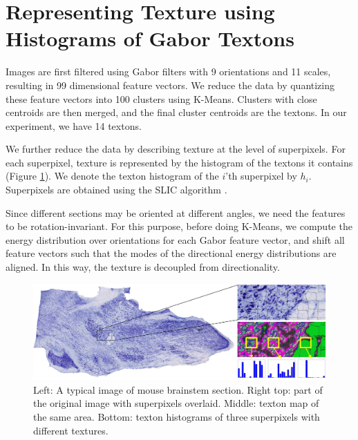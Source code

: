 \documentclass{llncs}
\begin{document}
\section{Representing Texture using Histograms of Gabor Textons} 

%
%
%

Images are first filtered using Gabor filters\cite{jain1990unsupervised} with 9 orientations and 11 scales, resulting in 99 dimensional feature vectors. We reduce the data by quantizing these feature vectors into 100 clusters using K-Means. Clusters with close centroids are then merged, and the final cluster centroids are the textons. In our experiment, we have 14 textons.


We further reduce the data by describing texture at the level of superpixels. For each superpixel, texture is represented by the histogram of the textons it contains (Figure \ref{fig:TextonHistComparison}). We denote the texton histogram of the $i$'th superpixel by $h_i$. Superpixels are obtained using the SLIC algorithm \cite{achanta2012slic}.

Since different sections may be oriented at different angles, 
we need the features to be rotation-invariant. For this purpose, before doing K-Means, we compute the energy distribution over orientations for each Gabor feature vector, and shift all feature vectors such that the modes of the directional energy distributions are aligned. In this way, the texture is decoupled from directionality.


\begin{figure}
\centering
	\includegraphics[width=.8\textwidth]{../figures/OrigImgTexMapWithInset.png}
	\caption{Left: A typical image of mouse brainstem section. Right top: part of the original image with superpixels overlaid. Middle: texton map of the same area. Bottom: texton histograms of three superpixels with different textures.}
	\label{fig:TextonHistComparison}
\end{figure}
\end{document}
